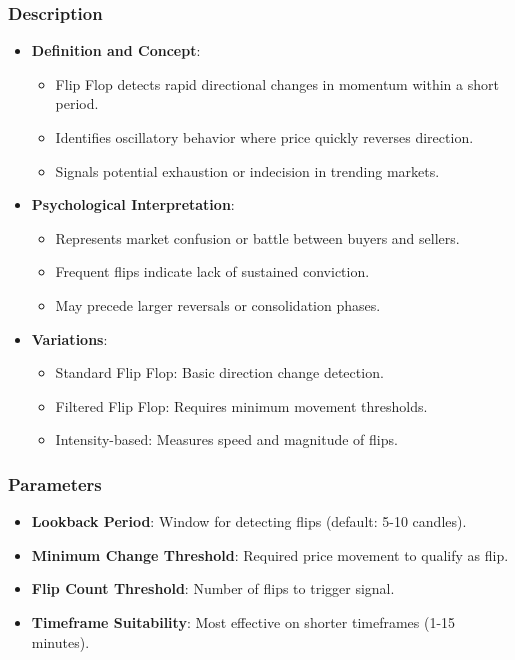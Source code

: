 \documentclass[12pt]{article}
\begin{document}
\subsubsection{Description}
\begin{itemize}
\item \textbf{Definition and Concept}:
  \begin{itemize}
  \item Flip Flop detects rapid directional changes in momentum within a short period.
  \item Identifies oscillatory behavior where price quickly reverses direction.
  \item Signals potential exhaustion or indecision in trending markets.
  \end{itemize}
\item \textbf{Psychological Interpretation}:
  \begin{itemize}
  \item Represents market confusion or battle between buyers and sellers.
  \item Frequent flips indicate lack of sustained conviction.
  \item May precede larger reversals or consolidation phases.
  \end{itemize}
\item \textbf{Variations}:
  \begin{itemize}
  \item Standard Flip Flop: Basic direction change detection.
  \item Filtered Flip Flop: Requires minimum movement thresholds.
  \item Intensity-based: Measures speed and magnitude of flips.
  \end{itemize}
\end{itemize}

\subsubsection{Parameters}
\begin{itemize}
\item \textbf{Lookback Period}: Window for detecting flips (default: 5-10 candles).
\item \textbf{Minimum Change Threshold}: Required price movement to qualify as flip.
\item \textbf{Flip Count Threshold}: Number of flips to trigger signal.
\item \textbf{Timeframe Suitability}: Most effective on shorter timeframes (1-15 minutes).
\end{itemize}
\end{document}
